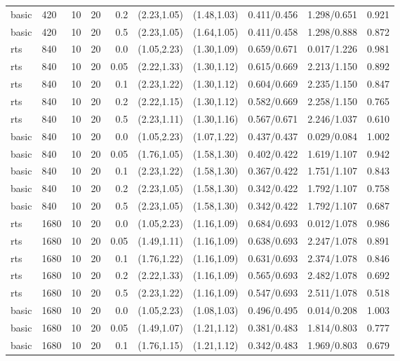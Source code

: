 \begin{tabular}{llrrrccccc}
basic & 420 & 10 & 20 & 0.2 & (2.23,1.05) & (1.48,1.03) & 0.411/0.456 & 1.298/0.651 & 0.921 \\
basic & 420 & 10 & 20 & 0.5 & (2.23,1.05) & (1.64,1.05) & 0.411/0.458 & 1.298/0.888 & 0.872 \\
rts & 840 & 10 & 20 & 0.0 & (1.05,2.23) & (1.30,1.09) & 0.659/0.671 & 0.017/1.226 & 0.981 \\
rts & 840 & 10 & 20 & 0.05 & (2.22,1.33) & (1.30,1.12) & 0.615/0.669 & 2.213/1.150 & 0.892 \\
rts & 840 & 10 & 20 & 0.1 & (2.23,1.22) & (1.30,1.12) & 0.604/0.669 & 2.235/1.150 & 0.847 \\
rts & 840 & 10 & 20 & 0.2 & (2.22,1.15) & (1.30,1.12) & 0.582/0.669 & 2.258/1.150 & 0.765 \\
rts & 840 & 10 & 20 & 0.5 & (2.23,1.11) & (1.30,1.16) & 0.567/0.671 & 2.246/1.037 & 0.610 \\
basic & 840 & 10 & 20 & 0.0 & (1.05,2.23) & (1.07,1.22) & 0.437/0.437 & 0.029/0.084 & 1.002 \\
basic & 840 & 10 & 20 & 0.05 & (1.76,1.05) & (1.58,1.30) & 0.402/0.422 & 1.619/1.107 & 0.942 \\
basic & 840 & 10 & 20 & 0.1 & (2.23,1.22) & (1.58,1.30) & 0.367/0.422 & 1.751/1.107 & 0.843 \\
basic & 840 & 10 & 20 & 0.2 & (2.23,1.05) & (1.58,1.30) & 0.342/0.422 & 1.792/1.107 & 0.758 \\
basic & 840 & 10 & 20 & 0.5 & (2.23,1.05) & (1.58,1.30) & 0.342/0.422 & 1.792/1.107 & 0.687 \\
rts & 1680 & 10 & 20 & 0.0 & (1.05,2.23) & (1.16,1.09) & 0.684/0.693 & 0.012/1.078 & 0.986 \\
rts & 1680 & 10 & 20 & 0.05 & (1.49,1.11) & (1.16,1.09) & 0.638/0.693 & 2.247/1.078 & 0.891 \\
rts & 1680 & 10 & 20 & 0.1 & (1.76,1.22) & (1.16,1.09) & 0.631/0.693 & 2.374/1.078 & 0.846 \\
rts & 1680 & 10 & 20 & 0.2 & (2.22,1.33) & (1.16,1.09) & 0.565/0.693 & 2.482/1.078 & 0.692 \\
rts & 1680 & 10 & 20 & 0.5 & (2.23,1.22) & (1.16,1.09) & 0.547/0.693 & 2.511/1.078 & 0.518 \\
basic & 1680 & 10 & 20 & 0.0 & (1.05,2.23) & (1.08,1.03) & 0.496/0.495 & 0.014/0.208 & 1.003 \\
basic & 1680 & 10 & 20 & 0.05 & (1.49,1.07) & (1.21,1.12) & 0.381/0.483 & 1.814/0.803 & 0.777 \\
basic & 1680 & 10 & 20 & 0.1 & (1.76,1.15) & (1.21,1.12) & 0.342/0.483 & 1.969/0.803 & 0.679 \\

\end{tabular}
